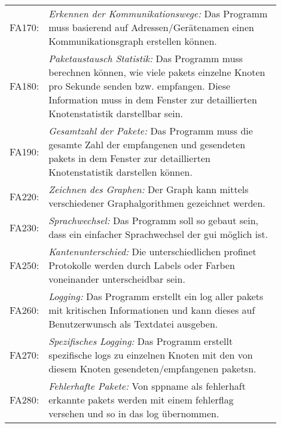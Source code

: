 \begin{longtable}{lp{0.9\linewidth}}
FA170: & \textit{Erkennen der Kommunikationswege: }Das Programm muss basierend auf Adressen/Gerätenamen einen Kommunikationsgraph erstellen können. \\

FA180: & \textit{Paketaustausch Statistik: }Das Programm muss berechnen können, wie viele \glspl{paket} einzelne Knoten pro Sekunde senden bzw. empfangen. Diese Information muss in dem Fenster zur detaillierten Knotenstatistik darstellbar sein. \\

FA190: & \textit{Gesamtzahl der Pakete: }Das Programm muss die gesamte Zahl der empfangenen und gesendeten \glspl{paket} in dem Fenster zur detaillierten Knotenstatistik darstellen können. \\

FA220: & \textit{Zeichnen des Graphen: }Der Graph kann mittels verschiedener Graphalgorithmen gezeichnet werden. \\

FA230: & \textit{Sprachwechsel: }Das Programm soll so gebaut sein, dass ein einfacher Sprachwechsel der \gls{gui} möglich ist. \\

FA250: & \textit{Kantenunterschied: }Die unterschiedlichen \gls{profinet} Protokolle werden durch Labels oder Farben voneinander unterscheidbar sein. \\

FA260: & \textit{Logging: }Das Programm erstellt ein \gls{log} aller \glspl{paket} mit kritischen Informationen und kann dieses auf Benutzerwunsch als Textdatei ausgeben. \\

FA270: & \textit{Spezifisches Logging: }Das Programm erstellt spezifische \glspl{log} zu einzelnen Knoten mit den von diesem Knoten gesendeten/empfangenen \glspl{paket}n. \\

FA280: & \textit{Fehlerhafte Pakete: }Von \gls{sppname} als fehlerhaft erkannte \glspl{paket} werden mit einem \gls{fehlerflag} versehen und so in das \gls{log} übernommen.

\end{longtable}

